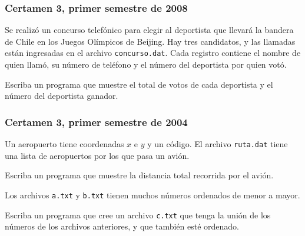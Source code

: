 \documentclass[12pt]{beamer}
\begin{document}
  \begin{frame}
    \frametitle{Certamen 3, primer semestre de 2008}
    Se realizó un concurso telefónico
    para elegir al deportista que llevará la bandera de Chile
    en los Juegos Olímpicos de Beijing.
    Hay tres candidatos, y las llamadas están ingresadas
    en el archivo \texttt{concurso.dat}.
    Cada registro contiene el nombre de quien llamó,
    su número de teléfono
    y el número del deportista por quien votó.

    Escriba un programa
    que muestre el total de votos de cada deportista
    y el número del deportista ganador.
  \end{frame}

  \begin{frame}
    \frametitle{Certamen 3, primer semestre de 2004}
    Un aeropuerto tiene coordenadas $x$ e $y$ y un código.
    El archivo \texttt{ruta.dat} tiene una lista de aeropuertos
    por los que pasa un avión.

    Escriba un programa que muestre la distancia total
    recorrida por el avión.
  \end{frame}

  \begin{frame}
    Los archivos \texttt{a.txt} y \texttt{b.txt}
    tienen muchos números ordenados de menor a mayor.

    Escriba un programa que cree un archivo \texttt{c.txt}
    que tenga la unión de los números de los archivos anteriores,
    y que también esté ordenado.
  \end{frame}
\end{document}
